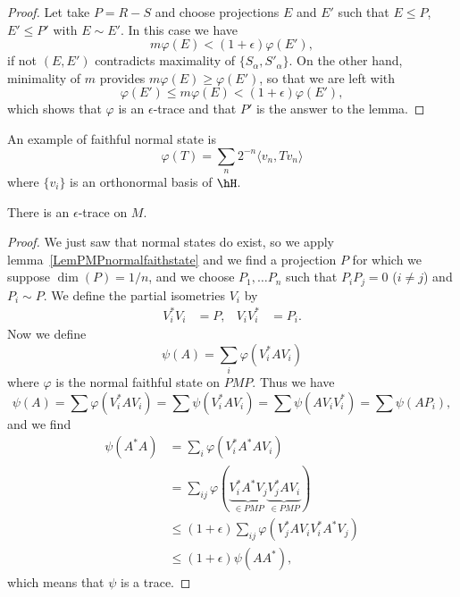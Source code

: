 \begin{proof}
Let take $P=R-S$ and choose projections $E$ and $E'$ such that $E\leq P$, $E'\leq P'$ with $E\sim E'$. In this case we have
\[
	m\varphi(E)<(1+\epsilon)\varphi(E'),
\]
if not $(E,E')$ contradicts maximality of $\{ S_{\alpha},S'_{\alpha} \}$. On the other hand, minimality of $m$ provides $m\varphi(E)\geq \varphi(E')$, so that we are left with
\begin{equation}
	\varphi(E')\leq m\varphi(E)<(1+\epsilon)\varphi(E'),
\end{equation}
which shows that $\varphi$ is an $\epsilon$-trace and that $P'$ is the answer to the lemma.

\end{proof}

An example of faithful normal state is
\begin{equation}
	\varphi(T)=\sum_n2^{-n}\langle v_n, Tv_n\rangle
\end{equation}
where $\{ v_i \}$ is an orthonormal basis of $\hH$.

\begin{proposition}
There is an $\epsilon$-trace on $M$.
\end{proposition}

\begin{proof}
We just saw that normal states do exist, so we apply lemma~\ref{LemPMPnormalfaithstate} and we find a projection $P$ for which we suppose $\dim(P)=1/n$, and we choose $P_1,\ldots P_n$ such that $P_iP_j=0$ ($i\neq j$) and $P_i\sim P$. We define the partial isometries $V_i$ by
\begin{align*}
	V_i^*V_i&=P,&V_iV_i^*&=P_i.
\end{align*}
Now we define
\[
	\psi(A)=\sum_i\varphi(V_i^*AV_i)
\]
where $\varphi$ is the normal faithful state on $PMP$. Thus we have
\[
	\psi(A)=\sum\varphi(V_i^*AV_i)=\sum\psi(V_i^*AV_i)=\sum\psi(AV_iV_i^*)=\sum\psi(AP_i),
\]
and we find
\begin{equation}
\begin{split}
	\psi(A^*A)	&=\sum_i\varphi(V_i^*A^*AV_i)\\
			&=\sum_{ij}\varphi(\underbrace{V_i^*A^*V_j}_{\in PMP}\underbrace{V_j^*AV_i}_{\in PMP})\\
			&\leq(1+\epsilon)\sum_{ij}\varphi(V_j^*AV_iV_i^*A^*V_j)\\
			&\leq (1+\epsilon)\psi(AA^*),
\end{split}
\end{equation}
which means that $\psi$ is a trace.
\end{proof}

